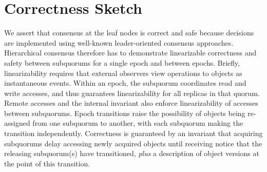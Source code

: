 \documentclass[sigconf]{acmart}
\begin{document}
\section{Correctness Sketch}

We assert that consensus at the leaf nodes is correct and safe because decisions are
implemented using well-known leader-oriented consensus approaches.
Hierarchical consensus therefore has to demonstrate linearizable correctness and safety
between subquorums for a single epoch and between epochs.
Briefly, linearizability requires that external observers view operations to objects as
instantaneous events.
Within an epoch, the subquorum coordinates read and write accesses, and thus guarantees
linearizability for all replicas in that quorum.
Remote accesses and the internal invariant also enforce linearizability of accesses
between subquorums.
Epoch transitions raise the possibility of objects being re-assigned from one subquorum to
another, with each subquorum making the transition independently. Correctness is
guaranteed by an invariant that acquiring subquorums delay accessing newly acquired objects
until receiving notice that the releasing subquorum(s) have transitioned, \emph{plus} a
description of object versions at the point of this transition.
\end{document}
